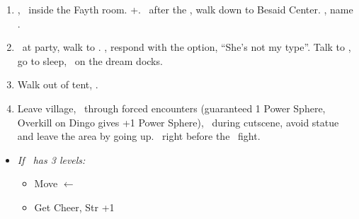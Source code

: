 \begin{enumerate}[resume]
    \item \cs[1:00], \sd\ inside the Fayth room. \fmv+\cs[1:00]. \sd\ after the \fmv, walk down to Besaid Center. \cs[1:40], name \valefor.
    \item \sd\ at party, walk to \yuna. \sd, respond with the  option, ``She's not my type''. Talk to \wakka, go to sleep, \sd\ on the dream docks.
    \item Walk out of tent, \sd.
    \item Leave village, \sd\ through forced encounters (guaranteed 1 Power Sphere, Overkill on Dingo gives +1 Power Sphere), \sd\ during cutscene, avoid statue and leave the area by going up. \skippablefmv\ right before the \kimahri\ fight.
\end{enumerate}
\begin{spheregrid}
    \begin{itemize}
        \item \textit{If \tidus\ has 3 levels:}
        \begin{itemize}
            \item Move $\leftarrow$
            \item Get Cheer, Str +1
        \end{itemize}
    \end{itemize}
\end{spheregrid}
